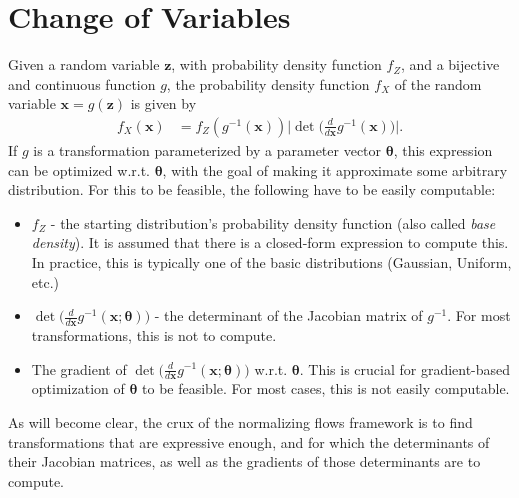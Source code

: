 \section{Change of Variables}
\label{cov}
Given a random variable $\bm{z}$, with probability density function $f_Z$,
and a bijective and continuous function $g$, the probability density function $f_X$
of the random variable $\bm{x} = g(\bm{z})$ is given by
\begin{align}
    f_X(\bm{x}) &= f_Z(g^{-1}(\bm{x}))\Big|\det\Big(\frac{d}{d\bm{x}}g^{-1}(\bm{x})\Big)\Big|.
\end{align} If $g$ is a transformation parameterized by a parameter vector $\bm\theta$,
this expression can be optimized w.r.t. $\bm\theta$, with the goal of making it
approximate some arbitrary distribution. For this to be feasible, the following
have to be easily computable:
\begin{itemize}
    \item $f_Z$ - the starting distribution's probability density function
        (also called \emph{base density}). It is assumed that there is a closed-form expression to
        compute this. In practice, this is typically one of the basic distributions
        (Gaussian, Uniform, etc.)
    \item $\det\Big(\frac{d}{d\bm{x}}g^{-1}(\bm{x};\bm\theta)\Big)$ - the determinant
        of the Jacobian matrix of $g^{-1}$. For most transformations, this is not
         to compute.
    \item The gradient of $\det\Big(\frac{d}{d\bm{x}}g^{-1}(\bm{x};\bm\theta)\Big)$
        w.r.t. $\bm\theta$. This is crucial for gradient-based optimization of
        $\bm\theta$ to be feasible. For most cases, this is not easily computable.
\end{itemize}
As will become clear, the crux of the normalizing flows framework is to find
transformations that are expressive enough, and for which the determinants of their
Jacobian matrices, as well as the gradients of those determinants are 
to compute.

